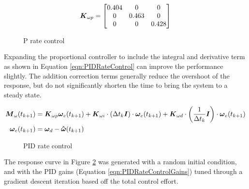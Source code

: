 \begin{equation}
  \boldsymbol{K}_{\omega p} = \begin{bmatrix} 0.404 & 0 & 0 \\ 0 & 0.463 & 0 \\ 0 & 0 & 0.428 \end{bmatrix}
\end{equation}

\begin{figure}[H]
  \centerline{}
  \caption{P rate control}
  \label{fig:PRateControl}
\end{figure}

Expanding the proportional controller to include the integral and derivative term as shown in Equation \ref{eqn:PIDRateControl} can improve the performance slightly.  The addition correction terms generally reduce the overshoot of the response, but do not significantly shorten the time to bring the system to a steady state.

\begin{equation}
  \begin{aligned}
    \boldsymbol{M}_{\omega}(t_{k+1}) &= \boldsymbol{K}_{\omega p} \boldsymbol{\omega}_e(t_{k+1}) + \boldsymbol{K}_{\omega i} \cdot (\Delta t_k \boldsymbol{I})\cdot \boldsymbol{\omega}_e(t_{k+1}) + \boldsymbol{K}_{\omega d} \cdot \left(\frac{1}{\Delta t_k} \boldsymbol{I}\right) \cdot \boldsymbol{\omega}_e(t_{k+1}) \\
    \boldsymbol{\omega}_e(t_{k+1}) &= \boldsymbol{\omega}_d - \boldsymbol{\hat{\omega}}(t_{k+1}) \\
  \end{aligned}
  \label{eqn:PRateControl}
\end{equation}

\begin{figure}[H]
  \centerline{}
  \caption{PID rate control}
  \label{fig:PIDRateControl}
\end{figure}

The response curve in Figure \ref{fig:PIDRateControl} was generated with a random initial condition, and with the PID gains (Equation \ref{eqn:PIDRateControlGains}) tuned through a gradient descent iteration based off the total control effort.

